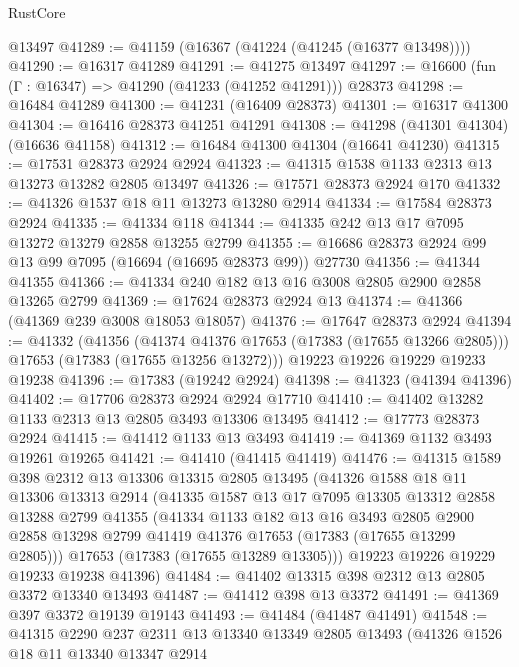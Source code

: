 \begin{lexlean}{RustCore}
\begin{coremodule}
    @13497
@41289 := @41159 (@16367 (@41224 (@41245 (@16377 @13498))))
@41290 := @16317 @41289
@41291 := @41275 @13497
@41297 := @16600 (fun (Γ : @16347) => @41290 (@41233 (@41252 @41291))) @28373
@41298 := @16484 @41289
@41300 := @41231 (@16409 @28373)
@41301 := @16317 @41300
@41304 := @16416 @28373 @41251 @41291
@41308 := @41298 (@41301 @41304) (@16636 @41158)
@41312 := @16484 @41300 @41304 (@16641 @41230)
@41315 := @17531 @28373 @2924 @2924
@41323 := @41315 @1538 @1133 @2313 @13 @13273 @13282 @2805 @13497
@41326 := @17571 @28373 @2924 @170
@41332 := @41326 @1537 @18 @11 @13273 @13280 @2914
@41334 := @17584 @28373 @2924
@41335 := @41334 @118
@41344 := @41335 @242 @13 @17 @7095 @13272 @13279 @2858 @13255 @2799
@41355 := @16686 @28373 @2924 @99 @13 @99 @7095 (@16694 (@16695 @28373 @99)) @27730
@41356 := @41344 @41355
@41366 := @41334 @240 @182 @13 @16 @3008 @2805 @2900 @2858 @13265 @2799
@41369 := @17624 @28373 @2924 @13
@41374 := @41366 (@41369 @239 @3008 @18053 @18057)
@41376 := @17647 @28373 @2924
@41394 := @41332
    (@41356
      (@41374 @41376 @17653 (@17383 (@17655 @13266 @2805)))
      @17653
      (@17383 (@17655 @13256 @13272)))
    @19223
    @19226
    @19229
    @19233
    @19238
@41396 := @17383 (@19242 @2924)
@41398 := @41323 (@41394 @41396)
@41402 := @17706 @28373 @2924 @2924 @17710
@41410 := @41402 @13282 @1133 @2313 @13 @2805 @3493 @13306 @13495
@41412 := @17773 @28373 @2924
@41415 := @41412 @1133 @13 @3493
@41419 := @41369 @1132 @3493 @19261 @19265
@41421 := @41410 (@41415 @41419)
@41476 := @41315
    @1589
    @398
    @2312
    @13
    @13306
    @13315
    @2805
    @13495
    (@41326
      @1588
      @18
      @11
      @13306
      @13313
      @2914
      (@41335
        @1587
        @13
        @17
        @7095
        @13305
        @13312
        @2858
        @13288
        @2799
        @41355
        (@41334
          @1133
          @182
          @13
          @16
          @3493
          @2805
          @2900
          @2858
          @13298
          @2799
          @41419
          @41376
          @17653
          (@17383 (@17655 @13299 @2805)))
        @17653
        (@17383 (@17655 @13289 @13305)))
      @19223
      @19226
      @19229
      @19233
      @19238
      @41396)
@41484 := @41402 @13315 @398 @2312 @13 @2805 @3372 @13340 @13493
@41487 := @41412 @398 @13 @3372
@41491 := @41369 @397 @3372 @19139 @19143
@41493 := @41484 (@41487 @41491)
@41548 := @41315
    @2290
    @237
    @2311
    @13
    @13340
    @13349
    @2805
    @13493
    (@41326
      @1526
      @18
      @11
      @13340
      @13347
      @2914

\end{coremodule}
\end{lexlean}

